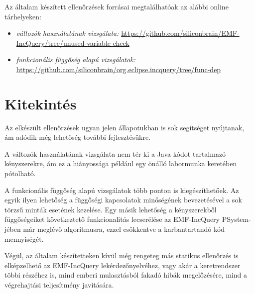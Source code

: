 Az általam készített ellenőrzések forrásai megtalálhatóak az alábbi online tárhelyeken:
\begin{itemize}
\item \textit{változók használatának vizsgálata:} \url{https://github.com/siliconbrain/EMF-IncQuery/tree/unused-variable-check}
\item \textit{funkcionális függőség alapú vizsgálatok:} \url{https://github.com/siliconbrain/org.eclipse.incquery/tree/func-dep}
\end{itemize}

\section{Kitekintés}

Az elkészült ellenőrzések ugyan jelen állapotukban is sok segítséget nyújtanak, ám adódik még lehetőség további fejlesztésükre.

A változók használatának vizsgálata nem tér ki a Java kódot tartalmazó kényszerekre, ám ez a hiányossága például egy önálló labormunka keretében pótolható.

A funkcionális függőség alapú vizsgálatok több ponton is kiegészíthetőek.
Az egyik ilyen lehetőség a függőségi kapcsolatok minőségének bevezetésével a sok törzsű minták esetének kezelése.
Egy másik lehetőség a kényszerekből függőségeiket következtető funkcionalitás lecserélése az EMF-IncQuery PSystem-jében már meglévő algoritmusra, ezzel csökkentve a karbantartandó kód mennyiségét.

Végül, az általam készítetteken kívül még rengeteg más statikus ellenőrzés is elképzelhető az EMF-IncQuery lekérdezőnyelvéhez, vagy akár a keretrendszer többi részéhez is, mind emberi mulasztásból fakadó hibák megelőzésére, mind a végrehajtási teljesítmény javítására. 
